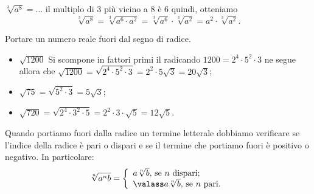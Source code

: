  $\sqrt[3]{a^8}=\ldots $ il multiplo di $3$ più vicino a $8$ è $6$ quindi, otteniamo 
\[\sqrt[3]{a^8}=\sqrt[3]{a^6\cdot a^2}=\sqrt[3]{a^6}\cdot \sqrt[3]{a^2}=a^2\cdot \sqrt[3]{a^2}.\]

\begin{exrig}
 \begin{esempio}
 Portare un numero reale fuori dal segno di radice.
\begin{itemize}
 \item $\sqrt{1200}$ Si scompone in fattori primi il radicando $1200=2^4\cdot 5^2\cdot 3$ ne segue allora che $\sqrt{1200}=\sqrt{2^4\cdot 5^2\cdot 3}=2^2\cdot 5\sqrt 3=20\sqrt 3$;
 \item $\sqrt{75}=\sqrt{5^2\cdot 3}=5\sqrt 3$;
 \item $\sqrt{720}=\sqrt{2^4\cdot 3^2\cdot 5}=2^2\cdot 3\cdot \sqrt 5=12\sqrt 5$.
\end{itemize}
 \end{esempio}
\end{exrig}

Quando portiamo fuori dalla radice un termine letterale dobbiamo verificare se l'indice della radice è pari o dispari e se il termine che portiamo fuori è positivo o negativo. In particolare:
\[\sqrt[n]{a^nb}=\left\{\begin{array}{l}
 a\sqrt[n]b\text{, se }n\text{ dispari;}\\
 \valass a\sqrt[n]b\text{, se }n\text{ pari.}\end{array}\right.\]

